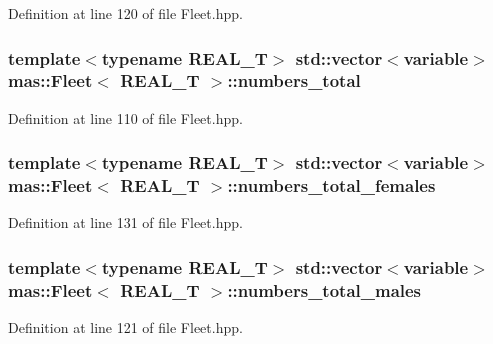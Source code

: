 Definition at line 120 of file Fleet.\-hpp.

\hypertarget{structmas_1_1_fleet_ad7457fd4d7e459925b87d50dc591b04c}{
\subsubsection[{numbers\-\_\-total}]{\setlength{\rightskip}{0pt plus 5cm}template$<$typename R\-E\-A\-L\-\_\-\-T$>$ std\-::vector$<${\bf variable}$>$ {\bf mas\-::\-Fleet}$<$ R\-E\-A\-L\-\_\-\-T $>$\-::numbers\-\_\-total}}\label{structmas_1_1_fleet_ad7457fd4d7e459925b87d50dc591b04c}


Definition at line 110 of file Fleet.\-hpp.

\hypertarget{structmas_1_1_fleet_a18952440bdaafdde0b75dd313ad542f5}{
\subsubsection[{numbers\-\_\-total\-\_\-females}]{\setlength{\rightskip}{0pt plus 5cm}template$<$typename R\-E\-A\-L\-\_\-\-T$>$ std\-::vector$<${\bf variable}$>$ {\bf mas\-::\-Fleet}$<$ R\-E\-A\-L\-\_\-\-T $>$\-::numbers\-\_\-total\-\_\-females}}\label{structmas_1_1_fleet_a18952440bdaafdde0b75dd313ad542f5}


Definition at line 131 of file Fleet.\-hpp.

\hypertarget{structmas_1_1_fleet_a40064758c90639b12944f9ef12aeaf01}{
\subsubsection[{numbers\-\_\-total\-\_\-males}]{\setlength{\rightskip}{0pt plus 5cm}template$<$typename R\-E\-A\-L\-\_\-\-T$>$ std\-::vector$<${\bf variable}$>$ {\bf mas\-::\-Fleet}$<$ R\-E\-A\-L\-\_\-\-T $>$\-::numbers\-\_\-total\-\_\-males}}\label{structmas_1_1_fleet_a40064758c90639b12944f9ef12aeaf01}


Definition at line 121 of file Fleet.\-hpp.

